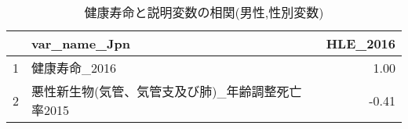 \begin{table}[ht]
\centering
\caption{健康寿命と説明変数の相関(男性,性別変数)}
\label{HLE_d_m_corr.tex}
\begingroup\tiny

\begin{adjustbox}{width=.5\textwidth}
\begin{tabular}{rlr}
  \hline
 & var\_name\_Jpn & HLE\_2016 \\
  \hline
1 & 健康寿命\_2016 & 1.00 \\
  2 & 悪性新生物(気管、気管支及び肺)\_年齢調整死亡率2015 & -0.41 \\
   \hline
\end{tabular}
\end{adjustbox}

\endgroup
\end{table}
